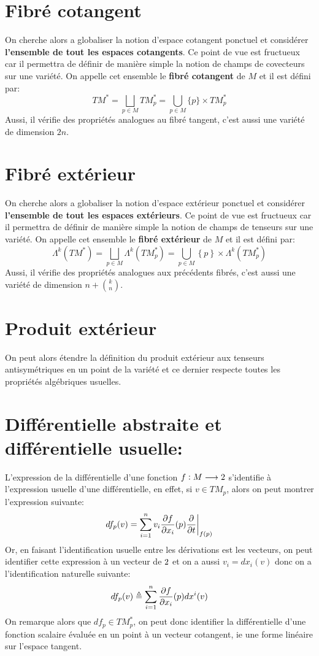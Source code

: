    \section{Fibré cotangent}
      On cherche alors a globaliser la notion d'espace cotangent ponctuel et considérer \textbf{l'ensemble de tout les espaces cotangents}. Ce point de vue est fructueux car il permettra de définir de manière simple la notion de champs de covecteurs sur une variété. On appelle cet ensemble le \textbf{fibré cotangent} de \( M \) et il est défini par:
      \[ 
         TM^* = \bigsqcup_{p \in M} TM^*_p = \bigcup_{p \in M} \{p\} \times TM^*_p
      \]
      Aussi, il vérifie des propriétés analogues au fibré tangent, c'est aussi une variété de dimension \( 2n \). 
   \section{Fibré extérieur}
      On cherche alors a globaliser la notion d'espace extérieur ponctuel et considérer \textbf{l'ensemble de tout les espaces extérieurs}. Ce point de vue est fructueux car il permettra de définir de manière simple la notion de champs de tenseurs sur une variété. On appelle cet ensemble le \textbf{fibré extérieur} de \( M \) et il est défini par:
      \[ 
         \Lambda^k(TM^*) = \bigsqcup_{p \in M} \Lambda^k(TM_p^*) = \bigcup_{p \in M} \left\{ p \right\} \times \Lambda^k(TM_p^*) 
      \]
      Aussi, il vérifie des propriétés analogues aux précédents fibrés, c'est aussi une variété de dimension \( n + \binom{k}{n} \). 
   \section{Produit extérieur}
      On peut alors étendre la définition du produit extérieur aux tenseurs antisymétriques en un point de la variété et ce dernier respecte toutes les propriétés algébriques usuelles.
   \section{Différentielle abstraite et différentielle usuelle:}
      L'expression de la différentielle d'une fonction \( f : M \longrightarrow 2 \) s'identifie à l'expression usuelle d'une différentielle, en effet, si \( v \in TM_p \), alors on peut montrer l'expression suivante:
      \[ 
         df_p(v) = \sum_{i=1}^n v_i \frac{\partial f}{\partial x_i}(p)\frac{\partial }{\partial t}\biggr|_{f(p)}
      \]
      Or, en faisant l'identification usuelle entre les dérivations est les vecteurs, on peut identifier cette expression à un vecteur de \(2\) et on a aussi \( v_i = dx_i(v) \) donc on a l'identification naturelle suivante:
      \[ 
         df_p(v) \triangleq \sum_{i=1}^n \frac{\partial f}{\partial x_i}(p)dx^i(v)
      \]
      On remarque alors que \( df_p \in TM^*_p \), on peut donc identifier la différentielle d'une fonction scalaire évaluée en un point à un vecteur cotangent, ie une forme linéaire sur l'espace tangent.\<

